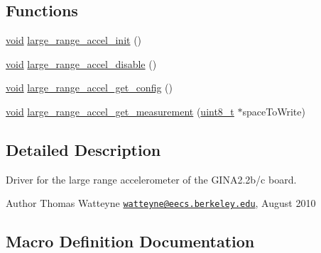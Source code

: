 \subsection*{Functions}
\begin{DoxyCompactItemize}
\item 
\hyperlink{usb__devapi_8h_afabf60e7f57651d6d595a02c75f07cd0}{void} \hyperlink{group___large_range_accel_ga363832787b3cf9f181d19bb3367a2aae}{large\+\_\+range\+\_\+accel\+\_\+init} ()
\item 
\hyperlink{usb__devapi_8h_afabf60e7f57651d6d595a02c75f07cd0}{void} \hyperlink{group___large_range_accel_ga3ebaa7e20e2127b059900954a8a7cf15}{large\+\_\+range\+\_\+accel\+\_\+disable} ()
\item 
\hyperlink{usb__devapi_8h_afabf60e7f57651d6d595a02c75f07cd0}{void} \hyperlink{group___large_range_accel_gaa586d4fc95efaa90700ae7f80925bfc5}{large\+\_\+range\+\_\+accel\+\_\+get\+\_\+config} ()
\item 
\hyperlink{usb__devapi_8h_afabf60e7f57651d6d595a02c75f07cd0}{void} \hyperlink{group___large_range_accel_ga6dd63e2fe61e53a9cecea5c4ba14a72c}{large\+\_\+range\+\_\+accel\+\_\+get\+\_\+measurement} (\hyperlink{_p_e___types_8h_aba7bc1797add20fe3efdf37ced1182c5}{uint8\+\_\+t} $\ast$space\+To\+Write)
\end{DoxyCompactItemize}


\subsection{Detailed Description}
Driver for the large range accelerometer of the G\+I\+N\+A2.\+2b/c board. 

\begin{DoxyAuthor}{Author}
Thomas Watteyne \href{mailto:watteyne@eecs.berkeley.edu}{\tt watteyne@eecs.\+berkeley.\+edu}, August 2010 
\end{DoxyAuthor}


\subsection{Macro Definition Documentation}
